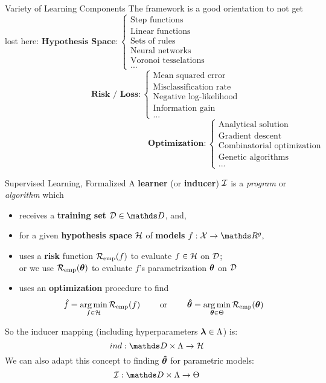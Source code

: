 \documentclass[11pt,compress,t,notes=noshow, xcolor=table]{beamer}
\begin{document}
\begin{frame2}[footnotesize]{Variety of Learning Components}
The framework is a good orientation to not get lost here:
\vfill
$\textbf{Hypothesis Space}:
\begin{cases} 
\text{Step functions} \\
\text{Linear functions}\\
\text{Sets of rules}\\
\text{Neural networks}\\
\text{Voronoi tesselations}\\
\text{...}
\end{cases}$
$\phantom{Hypothesis Space RISK } \textbf{Risk / Loss}: \begin{cases}
\text{Mean squared error}\\
\text{Misclassification rate}\\
\text{Negative log-likelihood}\\
\text{Information gain}\\
\text{...}
\end{cases}$
$\phantom{hypothesis space risk RISK RISK RISK} \textbf{Optimization}: \begin{cases}
\text{Analytical solution}\\
\text{Gradient descent}\\
\text{Combinatorial optimization}\\
\text{Genetic algorithms}\\
\text{...}
\end{cases}$
\end{frame2}


\begin{frame2}{Supervised Learning, Formalized}
A \textbf{learner} (or \textbf{inducer}) $\mathcal{I}$ is a \emph{program} or \emph{algorithm} which
\begin{itemize}
\item receives a \textbf{training set} $\D \in \allDatasets$, and,
\item for a given \textbf{hypothesis space} $\mathcal{H}$ of \textbf{models} $f:\Xspace \rightarrow \R^g,$ 
\item uses a \textbf{risk} function $\mathcal{R}_{\text{emp}}(f)$ to evaluate $f \in \mathcal{H}$ on $\mathcal{D}$;\\ 
or we use $\mathcal{R}_{\text{emp}}(\bm{\theta})$ to evaluate $f$'s parametrization $\bm{\theta}$ on $\mathcal{D}$
\item uses an \textbf{optimization} procedure to find
$$
\hat{f} = \mathop{\mathrm{arg\,min}}_{f \in \mathcal{H}} \mathcal{R}_{\text{emp}}(f) \qquad \text{ or } \qquad \bm{\hat\theta} = \mathop{\mathrm{arg\,min}}_{\bm{\theta} \in \Theta} \mathcal{R}_{\text{emp}}(\bm{\theta})
$$
\end{itemize}
So the inducer mapping (including hyperparameters $\bm{\lambda} \in \Lambda$) is:
$$
ind: \preimageInducerShort\rightarrow \Hspace
$$
We can also adapt this concept to finding $\bm{\hat\theta}$ for parametric models:
$$
\ind: \preimageInducerShort \rightarrow \Theta
$$
\end{frame2}
\end{document}
